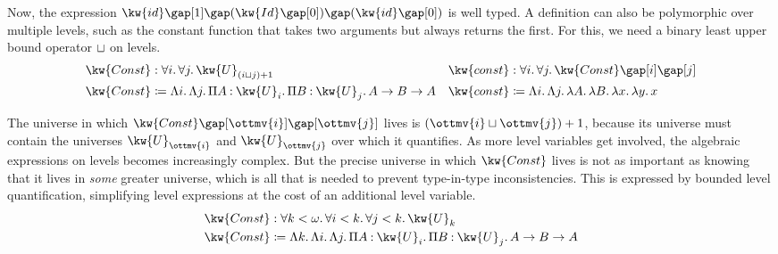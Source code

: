 \documentclass[a4paper,UKenglish,cleveref,autoref,thm-restate]{lipics-v2021}
\begin{document}
Now, the expression $    \kw{ id }   \gap [   1   ]   \gap   (   \kw{ Id }   \gap [   0   ]  )    \gap   (   \kw{ id }   \gap [   0   ]  )  $ is well typed.
A definition can also be polymorphic over multiple levels,
such as the constant function that takes two arguments but always returns the first.
For this, we need a binary least upper bound operator $  \relax   \sqcup   \relax  $ on levels.
%
\begin{align*}
   \kw{ Const }  &:  \forall  i  \mathpunct{.}   \forall  j  \mathpunct{.}   \kw{U}_{    (  i  \sqcup  j  )   + 1   }   
  & \kw{ const }  &:    \forall  i  \mathpunct{.}   \forall  j  \mathpunct{.}   \kw{ Const }     \gap [  i  ]   \gap [  j  ]  \\
   \kw{ Const }  &\coloneqq    \Lambda  i  \mathpunct{.}   \Lambda  j  \mathpunct{.}   \Pi  A  \mathbin{:}   \kw{U}_{ i }   \mathpunct{.}   \Pi  B  \mathbin{:}   \kw{U}_{ j }   \mathpunct{.}  A      \to  B   \to  A 
  & \kw{ const }  &\coloneqq  \Lambda  i  \mathpunct{.}   \Lambda  j  \mathpunct{.}   \lambda  A  \mathpunct{.}   \lambda  B  \mathpunct{.}   \lambda  x  \mathpunct{.}   \lambda  y  \mathpunct{.}  x      
\end{align*}

The universe in which $   \kw{ Const }   \gap [   \ottmv{i}   ]   \gap [   \ottmv{j}   ] $ lives is $  (   \ottmv{i}   \sqcup   \ottmv{j}   )   + 1 $,
because its universe must contain the universes
$ \kw{U}_{  \ottmv{i}  } $ and $ \kw{U}_{  \ottmv{j}  } $ over which it quantifies.
As more level variables get involved,
the algebraic expressions on levels becomes increasingly complex.
But the precise universe in which $ \kw{ Const } $ lives is not as important
as knowing that it lives in \emph{some} greater universe,
which is all that is needed to prevent type-in-type inconsistencies.
This is expressed by bounded level quantification,
simplifying level expressions at the cost of an additional level variable.
%
\begin{align*}
   \kw{ Const }  &:  \forall  k  <   \omega   \mathpunct{.}   \forall  i  <  k  \mathpunct{.}   \forall  j  <  k  \mathpunct{.}   \kw{U}_{ k }     \\
   \kw{ Const }  &\coloneqq    \Lambda  k  \mathpunct{.}   \Lambda  i  \mathpunct{.}   \Lambda  j  \mathpunct{.}   \Pi  A  \mathbin{:}   \kw{U}_{ i }   \mathpunct{.}   \Pi  B  \mathbin{:}   \kw{U}_{ j }   \mathpunct{.}  A       \to  B   \to  A 
\end{align*}
\end{document}
